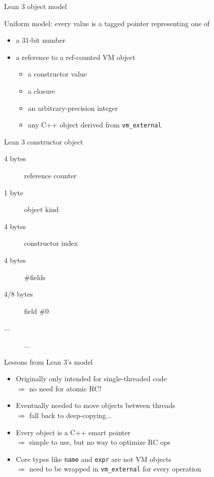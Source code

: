 \documentclass[t]{beamer}
\newcommand{\kit}[1]{\textcolor{KITgreen}{#1}}
\begin{document}
\begin{frame}[fragile]{Lean 3 object model}

Uniform model: every value is a \kit{tagged} pointer representing one of
  \begin{itemize}
  \item a 31-bit number
  \item a reference to a ref-counted VM object
    \begin{itemize}
    \item a constructor value
    \item a closure
    \item an arbitrary-precision integer
    \item any C++ object derived from \verb!vm_external!
    \end{itemize}
  \end{itemize}
\end{frame}

\begin{frame}{Lean 3 constructor object}

\begin{description}
\item[4 bytes] reference counter
\item[1 byte\phantom{s}]  object kind
\item[4 bytes] constructor index
\item[4 bytes] \#fields
\item[4/8 bytes] field \#0
\item[...] ...
\end{description} 
\end{frame}

\begin{frame}{Lessons from Lean 3's model}

  \begin{itemize}[<+->]
\item Originally only intended for single-threaded code \\
  $\Longrightarrow$ no need for atomic RC!
\item Eventually needed to move objects between threads \\
  $\Longrightarrow$ fall back to deep-copying...
\item Every object is a C++ smart pointer \\
  $\Longrightarrow$ simple to use, but no way to optimize RC ops
\item Core types like \texttt{name} and \texttt{expr} are not VM objects\\
  $\Longrightarrow$ need to be wrapped in \texttt{vm\_external} for every operation
\end{itemize}

\end{frame}
\end{document}
